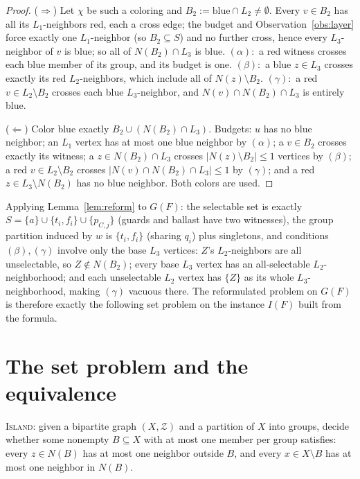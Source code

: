 \documentclass[11pt]{article}
\begin{document}
\begin{proof}
($\Rightarrow$) Let $\chi$ be such a coloring and $B_2 :=
\mathrm{blue} \cap L_2 \neq \emptyset$. Every $v \in B_2$ has all its
$L_1$-neighbors red, each a cross edge; the budget and
Observation~\ref{obs:layer} force exactly one $L_1$-neighbor (so
$B_2 \subseteq S$) and no further cross, hence every $L_3$-neighbor
of $v$ is blue; so all of $N(B_2) \cap L_3$ is blue. $(\alpha)$:~a
red witness crosses each blue member of its group, and its budget is
one. $(\beta)$:~a blue $z \in L_3$ crosses exactly its red
$L_2$-neighbors, which include all of $N(z) \setminus B_2$.
$(\gamma)$:~a red $v \in L_2 \setminus B_2$ crosses each blue
$L_3$-neighbor, and $N(v) \cap N(B_2) \cap L_3$ is entirely blue.

($\Leftarrow$) Color blue exactly $B_2 \cup (N(B_2) \cap L_3)$.
Budgets: $u$ has no blue neighbor; an $L_1$ vertex has at most one
blue neighbor by $(\alpha)$; a $v \in B_2$ crosses exactly its
witness; a $z \in N(B_2) \cap L_3$ crosses $|N(z) \setminus B_2| \le
1$ vertices by $(\beta)$; a red $v \in L_2 \setminus B_2$ crosses
$|N(v) \cap N(B_2) \cap L_3| \le 1$ by $(\gamma)$; and a red $z \in
L_3 \setminus N(B_2)$ has no blue neighbor. Both colors are used.
\end{proof}

Applying Lemma~\ref{lem:reform} to $G(F)$: the selectable set is
exactly $S = \{a\} \cup \{t_i, f_i\} \cup \{p_{C,j}\}$ (guards and
ballast have two witnesses), the group partition induced by $w$ is
$\{t_i, f_i\}$ (sharing $q_i$) plus singletons, and conditions
$(\beta),(\gamma)$ involve only the base $L_3$ vertices: $Z$'s
$L_2$-neighbors are all unselectable, so $Z \notin N(B_2)$; every
base $L_3$ vertex has an all-selectable $L_2$-neighborhood; and each
unselectable $L_2$ vertex has $\{Z\}$ as its whole
$L_3$-neighborhood, making $(\gamma)$ vacuous there. The
reformulated problem on $G(F)$ is therefore exactly the following set
problem on the instance $I(F)$ built from the formula.

\section{The set problem and the equivalence}\label{sec:island}

\textsc{Island}: given a bipartite graph $(X, \mathcal{Z})$ and a
partition of $X$ into groups, decide whether some nonempty $B
\subseteq X$ with at most one member per group satisfies: every $z
\in N(B)$ has at most one neighbor outside $B$, and every $x \in X
\setminus B$ has at most one neighbor in $N(B)$.
\end{document}
